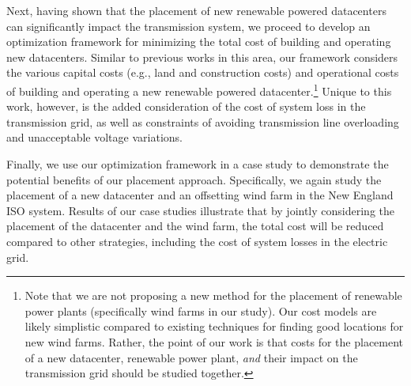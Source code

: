 
Next, having shown that the placement of new renewable powered datacenters can significantly impact the transmission system, we proceed to develop an optimization framework for minimizing the total cost of building and operating new datacenters.  Similar to previous works in this area, our framework considers the various capital costs (e.g., land and construction costs) and operational costs of building and operating a new renewable powered datacenter.\footnote{Note that we are not proposing a new method for the placement of renewable power plants (specifically wind farms in our study).  Our cost models are likely simplistic compared to existing techniques for finding good locations for new wind farms.  Rather, the point of our work is that costs for the placement of a new datacenter, renewable power plant, {\em and} their impact on the transmission grid should be studied together.}
  Unique to this work, however, is the added consideration of the cost of system loss in the transmission grid, as well as constraints of avoiding transmission line overloading and unacceptable voltage variations.

Finally, we use our optimization framework in a case study to demonstrate the potential benefits of our placement approach.  Specifically, we again study the placement of a new datacenter and an offsetting wind farm in the New England ISO system.   Results of our case studies illustrate that by jointly considering the placement of the datacenter and the wind farm, the total cost will be reduced compared to other strategies, including the cost of system losses in the electric grid.

